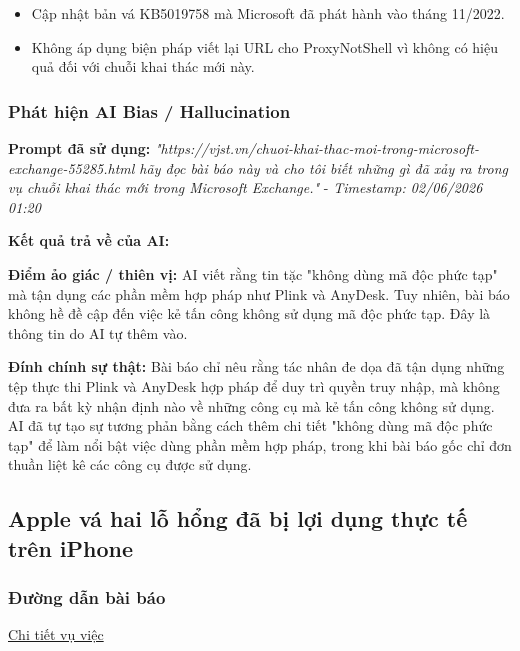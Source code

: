 \begin{itemize}
    \item Cập nhật bản vá KB5019758 mà Microsoft đã phát hành vào tháng 11/2022.
    \item Không áp dụng biện pháp viết lại URL cho ProxyNotShell vì không có hiệu quả đối với chuỗi khai thác mới này.
\end{itemize}

\subsubsection{Phát hiện AI Bias / Hallucination}
\textbf{Prompt đã sử dụng:} \textit{"{https://vjst.vn/chuoi-khai-thac-moi-trong-microsoft-exchange-55285.html} hãy đọc bài báo này và cho tôi biết những gì đã xảy ra trong vụ chuỗi khai thác mới trong Microsoft Exchange."} - \textit{Timestamp: 02/06/2026 01:20}

\textbf{Kết quả trả về của AI:}

\textbf{Điểm ảo giác / thiên vị:}
AI viết rằng tin tặc "không dùng mã độc phức tạp" mà tận dụng các phần mềm hợp pháp như Plink và AnyDesk. Tuy nhiên, bài báo không hề đề cập đến việc kẻ tấn công không sử dụng mã độc phức tạp. Đây là thông tin do AI tự thêm vào.

\textbf{Đính chính sự thật:}
Bài báo chỉ nêu rằng tác nhân đe dọa đã tận dụng những tệp thực thi Plink và AnyDesk hợp pháp để duy trì quyền truy nhập, mà không đưa ra bất kỳ nhận định nào về những công cụ mà kẻ tấn công không sử dụng. AI đã tự tạo sự tương phản bằng cách thêm chi tiết "không dùng mã độc phức tạp" để làm nổi bật việc dùng phần mềm hợp pháp, trong khi bài báo gốc chỉ đơn thuần liệt kê các công cụ được sử dụng.

\subsection{Apple vá hai lỗ hổng đã bị lợi dụng thực tế trên iPhone}

\subsubsection{Đường dẫn bài báo}
\href{https://vnexpress.net/apple-va-hai-lo-hong-da-bi-loi-dung-thuc-te-tren-iphone-4999426.html}{Chi tiết vụ việc}

